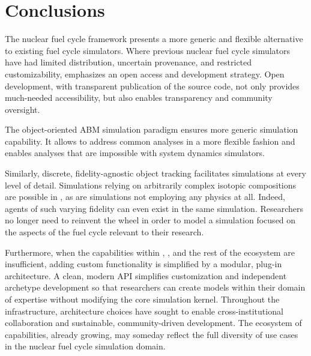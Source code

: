 

\section{Conclusions}



The \Cyclus nuclear fuel cycle framework presents a more generic and flexible
alternative to existing fuel cycle simulators. Where previous nuclear fuel cycle simulators have had limited distribution,
uncertain provenance, and restricted customizability, \Cyclus emphasizes an
open access and development strategy.  Open development, with transparent
publication of the source code, not only provides much-needed accessibility,
but also enables transparency and community oversight.

The object-oriented \gls{ABM} simulation paradigm ensures more generic
simulation capability. It allows \Cyclus to address common analyses in a more
flexible fashion and enables analyses that are impossible with system dynamics
simulators.

Similarly, discrete, fidelity-agnostic object tracking facilitates simulations
at every level of detail. Simulations relying on arbitrarily complex isotopic
compositions are possible in \Cyclus, as are simulations not employing any
physics at all. Indeed, agents of such varying fidelity can even exist in the
same simulation. Researchers no longer need to reinvent the wheel in order to
model a simulation focused on the aspects of the fuel cycle
relevant to their research.

Furthermore, when the capabilities within \Cyclus, \Cycamore, and the rest of
the ecosystem are insufficient, adding custom functionality is simplified by a
modular, plug-in architecture. A clean, modern \gls{API} simplifies
customization and independent archetype development so that researchers can
create models within their domain of expertise without modifying the core
simulation kernel. Throughout the \Cyclus
infrastructure, architecture choices have sought to enable cross-institutional
collaboration and sustainable, community-driven development. The ecosystem
of capabilities, already growing, may someday reflect the full diversity of use
cases in the nuclear fuel cycle simulation domain.


